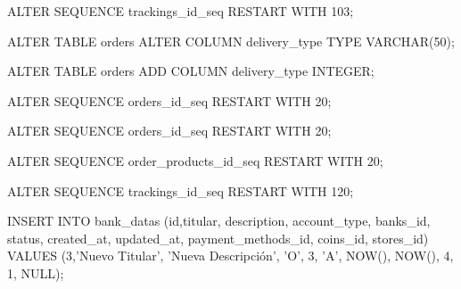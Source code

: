 ALTER SEQUENCE trackings_id_seq RESTART WITH 103;


ALTER TABLE orders
ALTER COLUMN delivery_type TYPE VARCHAR(50);

ALTER TABLE orders
ADD COLUMN delivery_type INTEGER;


ALTER SEQUENCE orders_id_seq RESTART WITH 20;

ALTER SEQUENCE orders_id_seq RESTART WITH 20;


ALTER SEQUENCE order_products_id_seq RESTART WITH 20;

ALTER SEQUENCE trackings_id_seq RESTART WITH 120;


INSERT INTO bank_datas (id,titular, description, account_type, banks_id, status, created_at, updated_at, payment_methods_id, coins_id, stores_id)
VALUES (3,'Nuevo Titular', 'Nueva Descripción', 'O', 3, 'A', NOW(), NOW(), 4, 1, NULL);












